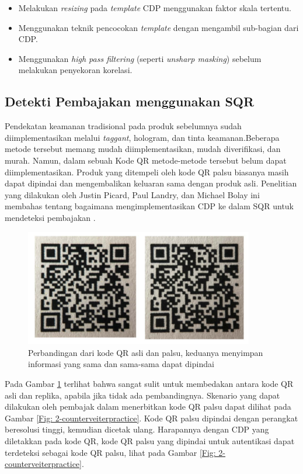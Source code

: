 \begin{itemize}
	\item Melakukan \emph{resizing} pada \emph{template} CDP menggunakan faktor skala tertentu.
	\item Menggunakan teknik pencocokan \emph{template} dengan mengambil sub-bagian dari CDP.
	\item Menggunakan \emph{high pass filtering} (seperti \emph{unsharp masking}) sebelum melakukan penyekoran korelasi.
\end{itemize}

\subsection{Detekti Pembajakan menggunakan SQR}
Pendekatan keamanan tradisional pada produk sebelumnya sudah diimplementasikan melalui \emph{taggant}, hologram, dan tinta keamanan.Beberapa metode tersebut
memang mudah diimplementasikan, mudah diverifikasi, dan murah. Namun, dalam sebuah Kode QR metode-metode tersebut belum dapat diimplementasikan. Produk yang
ditempeli oleh kode QR palsu biasanya masih dapat dipindai dan mengembalikan keluaran sama dengan produk asli. Penelitian yang dilakukan oleh Justin Picard,
Paul Landry, dan Michael Bolay ini membahas tentang bagaimana mengimplementasikan CDP ke dalam SQR untuk mendeteksi pembajakan \cite{picard2021counterfeit}.

\begin{figure}[h]
	\centering
	\includegraphics[width=10cm]{contents/chapter-2/2-qrorivspalsu.jpg}
	\caption{Perbandingan dari kode QR asli dan palsu, keduanya menyimpan informasi yang sama dan sama-sama dapat dipindai \cite{picard2021counterfeit}}
	\label{Fig: 2-qrorivspalsu}
\end{figure}

Pada Gambar \ref{Fig: 2-qrorivspalsu} terlihat bahwa sangat sulit untuk membedakan antara kode QR asli dan replika, apabila jika tidak ada pembandingnya.
Skenario yang dapat dilakukan oleh pembajak dalam menerbitkan kode QR palsu dapat dilihat pada Gambar \ref{Fig: 2-counterveiterpractice}. Kode QR palsu
dipindai dengan perangkat beresolusi tinggi, kemudian dicetak ulang. Harapannya dengan CDP yang diletakkan pada kode QR, kode QR palsu yang dipindai untuk
autentikasi dapat terdeteksi sebagai kode QR palsu, lihat pada Gambar \ref{Fig: 2-counterveiterpractice}.

